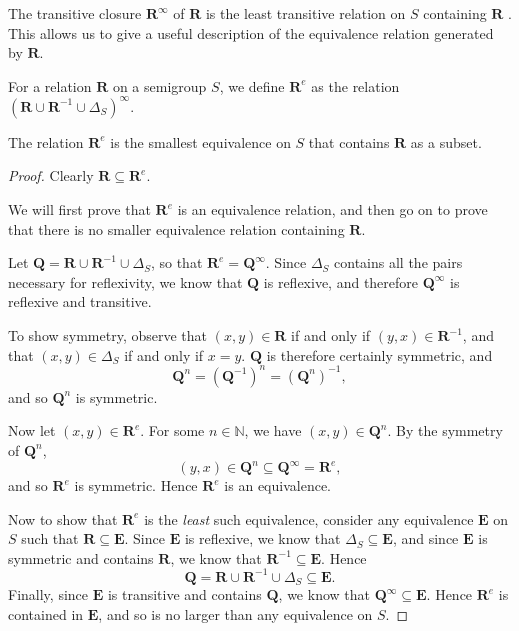 The transitive closure $\mathbf{R}^\infty$ of $\mathbf{R}$ is the least
transitive relation on $S$ containing $\mathbf{R}$ \cite[Lemma
2.3]{mtorpey_msc}.  This allows us to give a useful description of the
equivalence relation generated by $\mathbf{R}$.

\begin{definition}
  \label{def:re}
  For a relation $\mathbf{R}$ on a semigroup $S$, we define $\mathbf{R}^e$ as
  the relation $\left(\mathbf{R} \cup \mathbf{R}^{-1} \cup \Delta_S\right)^\infty$.
\end{definition}

\begin{lemma}
  \label{lem:re}
  The relation $\mathbf{R}^e$ is the smallest equivalence on $S$ that contains
  $\mathbf{R}$ as a subset.
  \begin{proof}
    Clearly $\mathbf{R} \subseteq \mathbf{R}^e$.

    We will first prove that $\mathbf{R}^e$ is an equivalence relation, and then
    go on to prove that there is no smaller equivalence relation containing
    $\mathbf{R}$.

    Let $\mathbf{Q} = \mathbf{R} \cup \mathbf{R}^{-1} \cup \Delta_S$, so that
    $\mathbf{R}^e = \mathbf{Q}^\infty$.  Since $\Delta_S$ contains all the
    pairs necessary for reflexivity, we know that $\mathbf{Q}$ is reflexive,
    and therefore $\mathbf{Q}^\infty$ is reflexive and transitive.

    To show symmetry, observe that $(x,y) \in \mathbf{R}$ if and only if $(y,x)
    \in \mathbf{R}^{-1}$, and that $(x,y) \in \Delta_S$ if and only if $x=y$.
    $\mathbf{Q}$ is therefore certainly symmetric, and
    $$\mathbf{Q}^n = (\mathbf{Q}^{-1})^n = (\mathbf{Q}^n)^{-1},$$
    and so $\mathbf{Q}^n$ is symmetric.

    Now let $(x,y) \in \mathbf{R}^e$.  For some $n \in \mathbb{N}$, we have
    $(x,y) \in \mathbf{Q}^n$.  By the symmetry of $\mathbf{Q}^n$,
    $$(y,x) \in \mathbf{Q}^n \subseteq \mathbf{Q}^\infty = \mathbf{R}^e,$$
    and so $\mathbf{R}^e$ is symmetric.  Hence $\mathbf{R}^e$ is an equivalence.

    Now to show that $\mathbf{R}^e$ is the \textit{least} such equivalence,
    consider any equivalence $\mathbf{E}$ on $S$ such that $\mathbf{R} \subseteq
    \mathbf{E}$.  Since $\mathbf{E}$ is reflexive, we know that $\Delta_S
    \subseteq \mathbf{E}$, and since $\mathbf{E}$ is symmetric and contains
    $\mathbf{R}$, we know that $\mathbf{R}^{-1} \subseteq \mathbf{E}$.  Hence
    $$\mathbf{Q}=\mathbf{R}\cup\mathbf{R}^{-1}\cup\Delta_S \subseteq \mathbf{E}.$$
    Finally, since $\mathbf{E}$ is transitive and contains $\mathbf{Q}$, we know
    that $\mathbf{Q}^\infty \subseteq \mathbf{E}$.  Hence $\mathbf{R}^e$ is
    contained in $\mathbf{E}$, and so is no larger than any equivalence on $S$.
  \end{proof}
\end{lemma}

